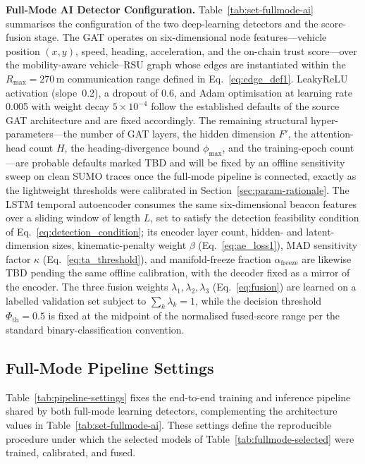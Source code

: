 \documentclass[12pt, a4paper]{report}
\begin{document}
\textbf{Full-Mode AI Detector Configuration.}
Table~\ref{tab:set-fullmode-ai} summarises the configuration of the two
deep-learning detectors and the score-fusion stage. The GAT operates on
six-dimensional node features---vehicle position $(x,y)$, speed, heading,
acceleration, and the on-chain trust score---over the mobility-aware
vehicle--RSU graph whose edges are instantiated within the
$R_{\max}=270$\,m communication range defined in
Eq.~\eqref{eq:edge_def1}. LeakyReLU activation (slope~0.2), a dropout of
0.6, and Adam optimisation at learning rate 0.005 with weight decay
$5\times10^{-4}$ follow the established defaults of the source GAT
architecture and are fixed accordingly. The remaining structural
hyper-parameters---the number of GAT layers, the hidden dimension $F'$,
the attention-head count $H$, the heading-divergence bound $\phi_{\max}$,
and the training-epoch count---are probable defaults marked TBD and will
be fixed by an offline sensitivity sweep on clean SUMO traces once the
full-mode pipeline is connected, exactly as the lightweight thresholds
were calibrated in Section~\ref{sec:param-rationale}. The LSTM temporal
autoencoder consumes the same six-dimensional beacon features over a
sliding window of length $L$, set to satisfy the detection feasibility
condition of Eq.~\eqref{eq:detection_condition}; its encoder layer count,
hidden- and latent-dimension sizes, kinematic-penalty weight $\beta$
(Eq.~\eqref{eq:ae_loss1}), MAD sensitivity factor $\kappa$
(Eq.~\eqref{eq:ta_threshold}), and manifold-freeze fraction
$\alpha_{\mathrm{freeze}}$ are likewise TBD pending the same offline
calibration, with the decoder fixed as a mirror of the encoder. The three
fusion weights $\lambda_1,\lambda_2,\lambda_3$ (Eq.~\eqref{eq:fusion}) are
learned on a labelled validation set subject to $\sum_k \lambda_k = 1$,
while the decision threshold $\Phi_{\mathrm{th}}=0.5$ is fixed at the
midpoint of the normalised fused-score range per the standard
binary-classification convention.


\subsection{Full-Mode Pipeline Settings}
\label{sec:pipeline-settings}

Table~\ref{tab:pipeline-settings} fixes the end-to-end training and inference
pipeline shared by both full-mode learning detectors, complementing the
architecture values in Table~\ref{tab:set-fullmode-ai}. These settings define the
reproducible procedure under which the selected models of
Table~\ref{tab:fullmode-selected} were trained, calibrated, and fused.
\end{document}
